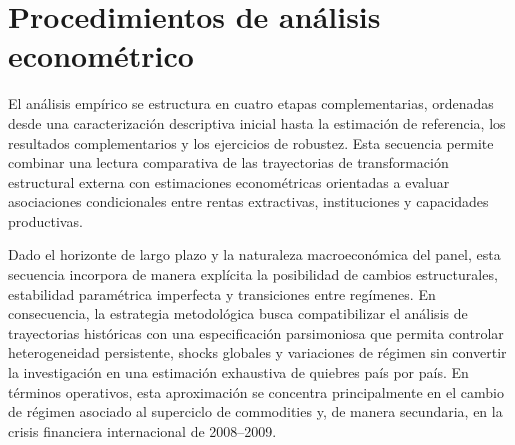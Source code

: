 \documentclass[../../PTFM.tex]{subfiles}
\begin{document}
	\section{Procedimientos de análisis econométrico}
	\label{sec:analisis-econometrico}

	El análisis empírico se estructura en cuatro etapas complementarias,
	ordenadas desde una caracterización descriptiva inicial hasta la
	estimación de referencia, los resultados complementarios y los ejercicios
	de robustez. Esta secuencia permite combinar una lectura comparativa de
	las trayectorias de transformación estructural externa con estimaciones
	econométricas orientadas a evaluar asociaciones condicionales entre rentas
	extractivas, instituciones y capacidades productivas.

	Dado el horizonte de largo plazo y la naturaleza macroeconómica del panel,
	esta secuencia incorpora de manera explícita la posibilidad de cambios
	estructurales, estabilidad paramétrica imperfecta y transiciones entre
	regímenes. En consecuencia, la estrategia metodológica busca compatibilizar
	el análisis de trayectorias históricas con una especificación parsimoniosa
	que permita controlar heterogeneidad persistente, shocks globales y
	variaciones de régimen sin convertir la investigación en una estimación
	exhaustiva de quiebres país por país. En términos operativos, esta
	aproximación se concentra principalmente en el cambio de régimen asociado
	al superciclo de commodities y, de manera secundaria, en la crisis
	financiera internacional de 2008--2009.
\end{document}
